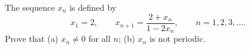 The sequence $x_n$ is defined by
\[ x_1 = 2,\qquad x_{n+1} = \frac{2 + x_n}{1 - 2x_n},\qquad n = 1, 2, 3, \ldots. \]
Prove that (a) $x_n \neq 0$ for all $n$; (b) $x_n$ is not periodic.
